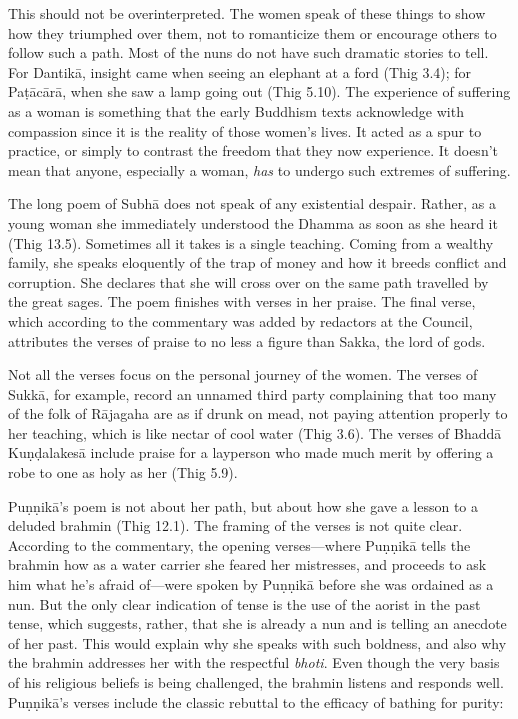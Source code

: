 \documentclass[12pt,openany]{book}%
\begin{document}
This should not be overinterpreted. The women speak of these things to show how they triumphed over them, not to romanticize them or encourage others to follow such a path. Most of the nuns do not have such dramatic stories to tell. For \textsanskrit{Dantikā}, insight came when seeing an elephant at a ford (Thig 3.4); for \textsanskrit{Paṭācārā}, when she saw a lamp going out (Thig 5.10). The experience of suffering as a woman is something that the early Buddhism texts acknowledge with compassion since it is the reality of those women’s lives. It acted as a spur to practice, or simply to contrast the freedom that they now experience. It doesn’t mean that anyone, especially a woman, \emph{has} to undergo such extremes of suffering.

The long poem of \textsanskrit{Subhā} does not speak of any existential despair. Rather, as a young woman she immediately understood the Dhamma as soon as she heard it (Thig 13.5). Sometimes all it takes is a single teaching. Coming from a wealthy family, she speaks eloquently of the trap of money and how it breeds conflict and corruption. She declares that she will cross over on the same path travelled by the great sages. The poem finishes with verses in her praise. The final verse, which according to the commentary was added by redactors at the Council, attributes the verses of praise to no less a figure than Sakka, the lord of gods.

Not all the verses focus on the personal journey of the women. The verses of \textsanskrit{Sukkā}, for example, record an unnamed third party complaining that too many of the folk of \textsanskrit{Rājagaha} are as if drunk on mead, not paying attention properly to her teaching, which is like nectar of cool water (Thig 3.6). The verses of \textsanskrit{Bhaddā} \textsanskrit{Kuṇḍalakesā} include praise for a layperson who made much merit by offering a robe to one as holy as her (Thig 5.9).

\textsanskrit{Puṇṇikā}’s poem is not about her path, but about how she gave a lesson to a deluded brahmin (Thig 12.1). The framing of the verses is not quite clear. According to the commentary, the opening verses—where \textsanskrit{Puṇṇikā} tells the brahmin how as a water carrier she feared her mistresses, and proceeds to ask him what he’s afraid of—were spoken by \textsanskrit{Puṇṇikā} before she was ordained as a nun. But the only clear indication of tense is the use of the aorist in the past tense, which suggests, rather, that she is already a nun and is telling an anecdote of her past. This would explain why she speaks with such boldness, and also why the brahmin addresses her with the respectful \textit{bhoti}. Even though the very basis of his religious beliefs is being challenged, the brahmin listens and responds well. \textsanskrit{Puṇṇikā}’s verses include the classic rebuttal to the efficacy of bathing for purity:
\end{document}
